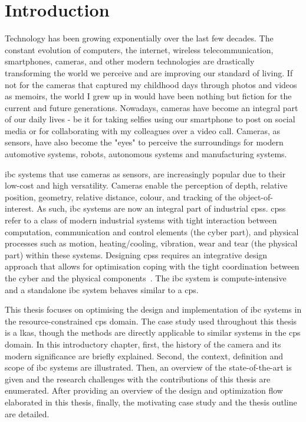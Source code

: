 \chapter{Introduction}%
\label{chap:intro}
\glsresetall

Technology has been growing exponentially over the last few decades.
The constant evolution of computers, the internet, wireless telecommunication, smartphones, cameras, and other modern technologies are drastically transforming the world we perceive and are improving our standard of living.
If not for the cameras that captured my childhood days through photos and videos as memoirs, the world I grew up in would have been nothing but fiction for the current and future generations.
Nowadays, cameras have become an integral part of our daily lives - be it for taking selfies using our smartphone to post on social media or for collaborating with my colleagues over a video call.
Cameras, as sensors, have also become the "eyes" to perceive the surroundings for modern automotive systems, robots, autonomous systems and manufacturing systems.

\Gls{ibc} systems that use cameras as sensors, are increasingly popular due to their low-cost and high versatility. 
Cameras enable the perception of depth, relative position, geometry, relative distance, colour, and tracking of the object-of-interest. 
As such, \gls{ibc} systems are now an integral part of industrial \glspl{cps}.
\Glspl{cps} refer to a class of modern industrial systems with tight interaction between computation, communication and control elements (the cyber part), and physical processes such as motion, heating/cooling, vibration, wear and tear (the physical part) within these systems.
Designing \glspl{cps} requires an integrative design approach that allows for optimisation coping with the tight coordination between the cyber and the physical components~\cite{lee2008cyber,gunes2014survey,sanislav2012cyber}.
The \gls{ibc} system is compute-intensive and a standalone \gls{ibc} system behaves similar to a \gls{cps}.

This thesis focuses on optimising the design and implementation of \gls{ibc} systems in the resource-constrained \gls{cps} domain.
The case study used throughout this thesis is a \gls{lkas}, though the methods are directly applicable to similar systems in the \gls{cps} domain.
In this introductory chapter, first, the history of the camera and its modern significance are briefly explained.
Second, the context, definition and scope of \gls{ibc} systems are illustrated.
Then, an overview of the state-of-the-art is given and the research challenges with the contributions of this thesis are enumerated. 
After providing an overview of the design and optimization flow elaborated in this thesis, finally, the motivating case study and the thesis outline are detailed.

